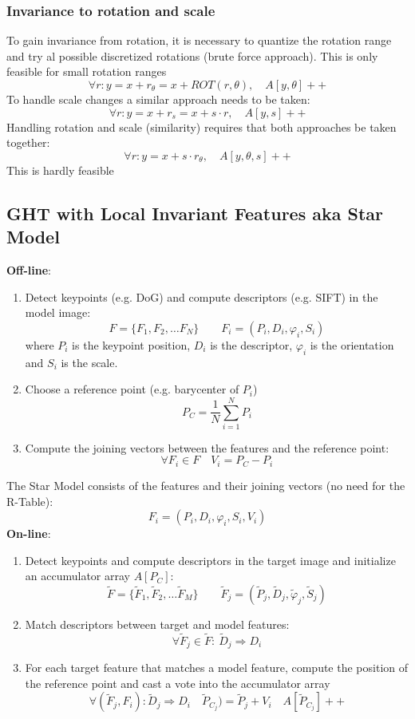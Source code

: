 \documentclass{article}
\begin{document}
\subsubsection{Invariance to rotation and scale}
To gain invariance from rotation, it is necessary to quantize the rotation range and try al possible discretized rotations (brute force approach). This is only feasible for small rotation ranges
\[
    \forall r:y=x+r_\theta =x + ROT(r,\theta), \quad A[y,\theta]++
\]
To handle scale changes a similar approach needs to be taken:
\[
    \forall r:y=x+r_s = x + s\cdot r, \quad A[y,s]++
\]
Handling rotation and scale (similarity) requires that both approaches be taken together:
\[
    \forall r:y=x+ s\cdot r_\theta, \quad A[y,\theta,s]++
\]
This is hardly feasible
\subsection{GHT with Local Invariant Features aka Star Model}
\textbf{Off-line}:
\begin{enumerate}
    \item Detect keypoints (e.g. DoG) and compute descriptors (e.g. SIFT) in the model image:
        \[
            F =\{ F_1, F_2,\dots F_N \} \qquad F_i = (P_i, D_i, \varphi_i, S_i)
        \]
        where $P_i$ is the keypoint position, $D_i$ is the descriptor, $\varphi_i$ is the orientation and $S_i$ is the scale. 
    \item Choose a reference point (e.g. barycenter of $P_i$)
        \[
            P_C = \displaystyle\frac{1}{N}\displaystyle\sum_{i=1}^{N}P_i
        \] 
        \item Compute the joining vectors between the features and the reference point:
            \[
                \forall F_i \in F \quad V_i = P_C - P_i
            \]
\end{enumerate}
The Star Model consists of the features and their joining vectors (no need for the R-Table):
\[
    F_i  = (P_i, D_i, \varphi_i, S_i, V_i)
\]
\textbf{On-line}:
\begin{enumerate}
    \item Detect keypoints and compute descriptors in the target image and initialize an accumulator array $A[P_C]$:
        \[
            \tilde{F} =\{ \tilde{F}_1, \tilde{F}_2,\dots \tilde{F}_M \} \qquad \tilde{F}_j = (\tilde{P}_j, \tilde{D}_j, \tilde{\varphi}_j, \tilde{S}_j)
        \]
    \item Match descriptors between target and model features:
        \[
            \forall \tilde{F}_j \in \tilde{F}:\ \tilde{D}_j \Rightarrow D_i
        \] 
        \item For each target feature that matches a model feature, compute the position of the reference point and cast a vote into the accumulator array 
            \[
                \forall (\tilde{F}_j, F_i): \tilde{D}_j\Rightarrow D_i  \quad \tilde{P}_{C_j}) = \tilde{P}_j + V_i \quad A[\tilde{P}_{C_j}]++
            \]
\end{enumerate}
\end{document}
